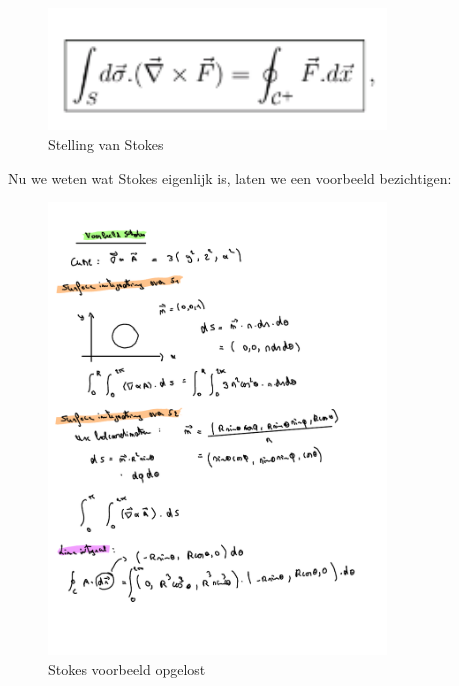 \documentclass[a4paper]{report}
\begin{document}
\begin{figure}[H]
	\centering
	\includegraphics[width=0.8\textwidth]{assets/Stelling van Stokes.png}
	\caption{Stelling van Stokes}
	\label{fig:stelling-van-stokes}
\end{figure}

Nu we weten wat Stokes eigenlijk is, laten we een voorbeeld bezichtigen:


\begin{figure}[H]
	\centering
	\includegraphics[width=0.8\textwidth]{assets/stokes_voorbeeld.pdf}
	\caption{Stokes voorbeeld opgelost}
	\label{fig:stokes_voorbeeld_opgelost}
\end{figure}
\end{document}
